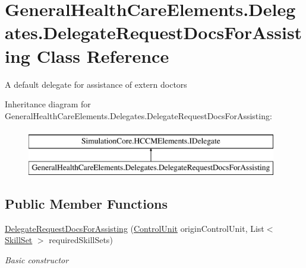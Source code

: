 \hypertarget{class_general_health_care_elements_1_1_delegates_1_1_delegate_request_docs_for_assisting}{}\section{General\+Health\+Care\+Elements.\+Delegates.\+Delegate\+Request\+Docs\+For\+Assisting Class Reference}
\label{class_general_health_care_elements_1_1_delegates_1_1_delegate_request_docs_for_assisting}


A default delegate for assistance of extern doctors  


Inheritance diagram for General\+Health\+Care\+Elements.\+Delegates.\+Delegate\+Request\+Docs\+For\+Assisting\+:\begin{figure}[H]
\begin{center}
\leavevmode
\includegraphics[height=2.000000cm]{class_general_health_care_elements_1_1_delegates_1_1_delegate_request_docs_for_assisting}
\end{center}
\end{figure}
\subsection*{Public Member Functions}
\begin{DoxyCompactItemize}
\item 
\hyperlink{class_general_health_care_elements_1_1_delegates_1_1_delegate_request_docs_for_assisting_a87c7b73a413ece1189c223f39223dd41}{Delegate\+Request\+Docs\+For\+Assisting} (\hyperlink{class_simulation_core_1_1_h_c_c_m_elements_1_1_control_unit}{Control\+Unit} origin\+Control\+Unit, List$<$ \hyperlink{class_simulation_core_1_1_h_c_c_m_elements_1_1_skill_set}{Skill\+Set} $>$ required\+Skill\+Sets)
\begin{DoxyCompactList}\small\item\em Basic constructor \end{DoxyCompactList}\end{DoxyCompactItemize}
